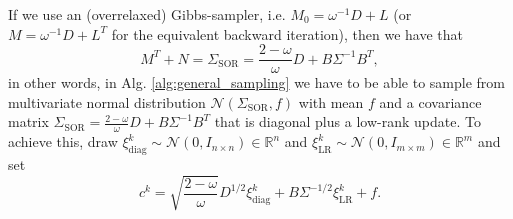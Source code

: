 \documentclass[11pt]{article}
\begin{document}
If we use an (overrelaxed) Gibbs-sampler, i.e. $M_0=\omega^{-1} D+L$ (or $M=\omega^{-1} D+L^T$ for the equivalent backward iteration), then we have that
\begin{equation}
    M^T+N = \Sigma_{\text{SOR}} = \frac{2-\omega}{\omega}D + B\Sigma^{-1}B^T,
\end{equation}
in other words, in Alg. \ref{alg:general_sampling} we have to be able to sample from multivariate normal distribution $\mathcal{N}(\Sigma_{\text{SOR}},f)$ with mean $f$ and a covariance matrix $\Sigma_{\text{SOR}}=\frac{2-\omega}{\omega}D + B\Sigma^{-1}B^T$ that is diagonal plus a low-rank update. To achieve this, draw $\xi^k_\text{diag}\sim\mathcal{N}(0,I_{n\times n})\in\mathbb{R}^n$ and $\xi^k_\text{LR}\sim\mathcal{N}(0,I_{m\times m})\in\mathbb{R}^m$ and set
\begin{equation}
    c^k = \sqrt{\frac{2-\omega}{\omega}}D^{1/2} \xi^k_{\text{diag}} + B\Sigma^{-1/2} \xi^k_{\text{LR}} + f.
\end{equation}

\end{document}
